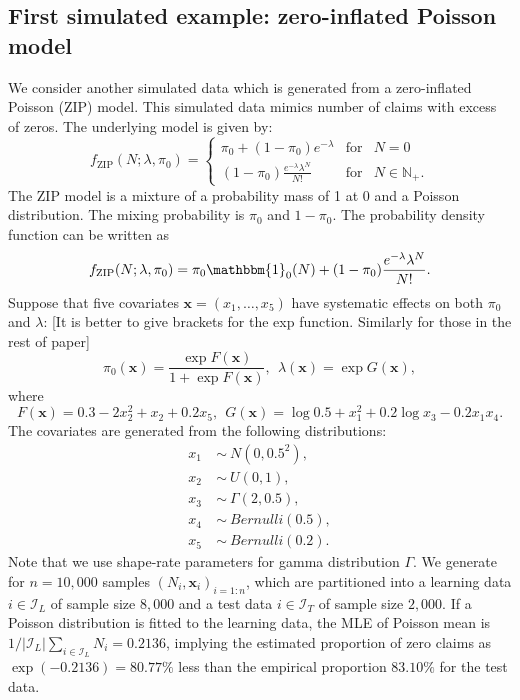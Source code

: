 \documentclass[11pt]{article}
\numberwithin{equation}{section}
\def\N{{\mathbb N}}  %
\def\bx{\boldsymbol{x}}
\begin{document}
\subsection{First simulated example: zero-inflated Poisson model}

We consider another simulated data which is generated from a zero-inflated Poisson (ZIP) model. This simulated data mimics number of claims with excess of zeros.
The underlying  model is given by:
\begin{equation}
	f_{\text{ZIP}}(N;\lambda,\pi_0) = \left\{ 
	\begin{array}{ccl}
		\pi_0+(1-\pi_0)e^{-\lambda} & \mbox{for}
		& N=0 \\
		(1-\pi_0)\frac{e^{-\lambda}\lambda^N}{N!} & \mbox{for} &N\in\N_+.
	\end{array}\right.
\end{equation}
The ZIP model is a mixture of a probability mass of 1 at 0 and a Poisson distribution. The mixing probability is $\pi_0$ and $1-\pi_0$.
The probability density function can be written as
$$f_\text{ZIP}(N;\lambda,\pi_0)= \pi_0\mathbbm{1}_{0}(N) + 
(1-\pi_0)\frac{e^{-\lambda}\lambda^N}{N!}.$$
Suppose that five covariates $\bx=(x_1,\ldots,x_5)$ have systematic effects on both $\pi_0$ and $\lambda$: {\color{blue}[It is better to give brackets for the exp function. Similarly for those in the rest of paper]}
\begin{equation}
	\pi_0(\bx)=\frac{\exp F(\bx)}{1+\exp F(\bx)}, ~~
	\lambda(\bx)=\exp G(\bx), 
\end{equation}
where
\begin{equation}
	F(\bx)=0.3-2x_2^2+x_2+0.2x_5, ~~G(\bx)=\log 0.5+x_1^2 + 0.2\log x_3 - 0.2x_1 x_4.
\end{equation}
The covariates are generated from the following distributions:
\begin{align*}
	x_1~&\sim~N(0,0.5^2),\\
	x_2~&\sim~U(0,1), \\
	x_3~&\sim~\Gamma(2,0.5), \\
	x_4~&\sim~Bernulli(0.5),\\
	x_5~&\sim~Bernulli(0.2).
\end{align*}
Note that we use shape-rate parameters for gamma distribution $\Gamma$.
We generate for $n=10,000$ samples $(N_i,\bx_i)_{i=1:n}$, which are partitioned into a learning data $i\in\mathcal{I}_{L}$ of sample size $8,000$ and a test data $i\in\mathcal{I}_{T}$ of sample size $2,000$. 
If a Poisson distribution is fitted to the learning data, the MLE of Poisson mean is $1/|\mathcal{I}_L|\sum_{i\in\mathcal{I}_L}N_i=0.2136$, implying the estimated proportion of zero claims as $\exp(-0.2136)=80.77\%$ less than the empirical proportion $83.10\%$ for the test data. 
\end{document}
